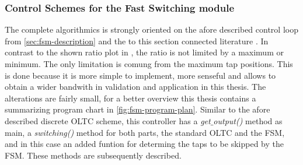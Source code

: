 % 





\subsubsection{Control Schemes for the Fast Switching module}

The complete algorithmics is strongly oriented on the afore described control loop from \autoref{sec:fsm-description} and the to this section connected literature \autocite{burlakin_2024,burlakin_2024a,maschinenfabrikreinhausengmbh_2023}.
In contrast to the shown ratio plot in \textcite{burlakin_2024}, the ratio is not limited by a maximum or minimum.
The only limitation is comung from the maximum tap positions.
This is done because it is more simple to implement, more senseful and allows to obtain a wider bandwith in validation and application in this thesis.
The alterations are fairly small, for a better overview this thesis contains a summarizing program chart in \autoref{fig:fsm-program-plan}.
Similar to the afore described discrete \acs{OLTC} scheme, this controller has a \textit{get$\_$output()} method as main, a \textit{switching()} method for both parts, the standard \acs{OLTC} and the \acs{FSM}, and in this case an added funtion for determing the taps to be skipped by the \acs{FSM}.
These methods are subsequently described.

